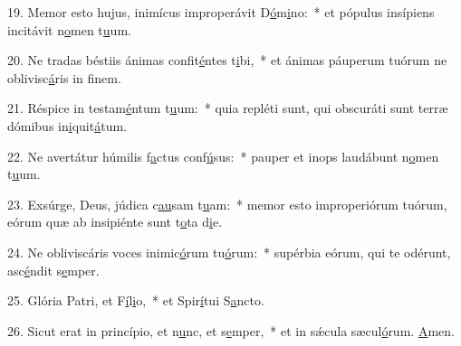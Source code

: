 19. Memor esto hujus, inimícus improperávit D\uline{ó}m\uline{i}no:~* et pópulus insípiens incitávit n\uline{o}men t\uline{u}um.\par 
20. Ne tradas béstiis ánimas confit\uline{é}ntes t\uline{i}bi,~* et ánimas páuperum tuórum ne oblivisc\uline{á}ris in f\uline{i}nem.\par 
21. Réspice in testam\uline{é}ntum t\uline{u}um:~* quia repléti sunt, qui obscuráti sunt terræ dómibus in\uline{i}quit\uline{á}tum.\par 
22. Ne avertátur húmilis f\uline{a}ctus conf\uline{ú}sus:~* pauper et inops laudábunt n\uline{o}men t\uline{u}um.\par 
23. Exsúrge, Deus, júdica c\uline{au}sam t\uline{u}am:~* memor esto improperiórum tuórum, eórum quæ ab insipiénte sunt t\uline{o}ta d\uline{i}e.\par 
24. Ne obliviscáris voces inimic\uline{ó}rum tu\uline{ó}rum:~* supérbia eórum, qui te odérunt, asc\uline{é}ndit s\uline{e}mper.\par 
25. Glória Patri, et F\uline{í}l\uline{i}o,~* et Spir\uline{í}tui S\uline{a}ncto.\par 
26. Sicut erat in princípio, et n\uline{u}nc, et s\uline{e}mper,~* et in sǽcula sæcul\uline{ó}rum. \uline{A}men.\par 

